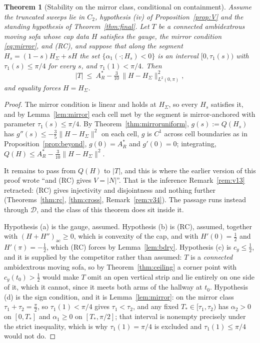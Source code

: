 \documentclass[11pt]{article}
\newtheorem{theorem}{Theorem}
\theoremstyle{definition}
\newcommand{\Sig}{\Sigma}
\begin{document}
\begin{theorem}[Stability on the mirror class, conditional on containment]\label{thm:mirrorstab}
Assume the truncated sweeps lie in $C_2$, hypothesis (iv) of Proposition~\ref{prop:V} and the
standing hypothesis of Theorem~\ref{thm:final}. Let $T$ be a connected ambidextrous moving
sofa whose cap data $H$ satisfies the gauge, the mirror condition \eqref{eq:mirror}, and
(RC), and suppose that along the segment $H_s=(1-s)H_\Sig+sH$ the set
$\{\alpha_1(\cdot;H_s)<0\}$ is an interval $[0,\tau_1(s))$ with $\tau_1(s)\le\pi/4$ for every
$s$, and $\tau_1(1)<\pi/4$. Then
\[
  |T|\ \le\ A_R^\ast-\tfrac3{10}\,\|H-H_\Sig\|^2_{L^2(0,\pi)} ,
\]
and equality forces $H=H_\Sig$.
\end{theorem}

\begin{proof}
The mirror condition is linear and holds at $H_\Sig$, so every $H_s$ satisfies it, and by
Lemma~\ref{lem:mirror} each cell met by the segment is mirror-anchored with parameter
$\tau_1(s)\le\pi/4$. By Theorem~\ref{thm:mirroruniform}, $g(s):=Q(H_s)$ has
$g''(s)\le-\tfrac35\|H-H_\Sig\|^2$ on each cell, $g$ is $C^1$ across cell boundaries as in
Proposition~\ref{prop:beyond}, $g(0)=A_R^\ast$ and $g'(0)=0$; integrating,
$Q(H)\le A_R^\ast-\tfrac3{10}\|H-H_\Sig\|^2$.

It remains to pass from $Q(H)$ to $|T|$, and this is where the earlier version of this proof
wrote ``and (RC) gives $V=|N|$''. That is the inference Remark~\ref{rem:v13} retracted: (RC)
gives injectivity and disjointness and nothing further (Theorems~\ref{thm:rc},
\ref{thm:cross}, Remark~\ref{rem:v34}). The passage runs instead through $\mathcal D$, and
the class of this theorem does sit inside it.

Hypothesis (a) is the gauge, assumed. Hypothesis (b) is (RC), assumed, together with
$(H+H'')_{\mathrm{ac}}\ge0$, which is convexity of the cap, and with $H'(0)=\tfrac12$ and
$H'(\pi)=-\tfrac12$, which (RC) forces by Lemma~\ref{lem:bdry}. Hypothesis (c) is
$c_y\le\tfrac12$, and it is supplied by the competitor rather than assumed: $T$ is a
\emph{connected} ambidextrous moving sofa, so by Theorem~\ref{thm:ceiling} a corner point
with $c_y(t_0)>\tfrac12$ would make $T$ omit an open vertical strip and lie entirely on one
side of it, which it cannot, since it meets both arms of the hallway at $t_0$. Hypothesis (d)
is the sign condition, and it is Lemma~\ref{lem:mirror}: on the mirror class
$\tau_1+\tau_2=\tfrac\pi2$, so $\tau_1(1)<\pi/4$ gives $\tau_1<\tau_2$, and any fixed
$T_\ast\in[\tau_1,\tau_2)$ has $\alpha_2>0$ on $[0,T_\ast]$ and $\alpha_1\ge0$ on
$[T_\ast,\pi/2]$; that interval is nonempty precisely under the strict inequality, which is
why $\tau_1(1)=\pi/4$ is excluded and $\tau_1(1)\le\pi/4$ would not do.


\end{proof}
\end{document}

